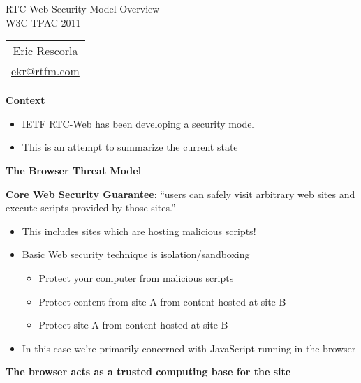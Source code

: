 \documentclass[helvetica]{seminar}
\newcommand{\heading}[1]{%
  \begin{center} 
    \large\bf 
    #1 
  \end{center} 
  \vspace{.4 in}}
\begin{document}
\begin{slide}
\begin{center}
\vspace{1 in}
\LARGE{{\bf}RTC-Web Security Model Overview}\\
\vspace{.2in}
\large{{W3C TPAC 2011}} \\
\vspace{3em}
\large{
\begin{tabular}{c}
Eric Rescorla \\
\url{ekr@rtfm.com}
\end{tabular}
}
\end{center}

\end{slide}


\centerslidesfalse 



\begin{slide}
\heading{Context}

\begin{itemize}
\item IETF RTC-Web has been developing a security model
\item This is an attempt to summarize the current state
\end{itemize}

\end{slide}


\begin{slide}
\heading{The Browser Threat Model}

\textbf{Core Web Security Guarantee}: ``users can safely visit arbitrary web sites
and execute scripts provided by those sites.''\cite{huang-cache}

\vspace{1em}

\begin{itemize}
\item This includes sites which are hosting malicious scripts!
\item Basic Web security technique is isolation/sandboxing
  \begin{itemize}
  \item Protect your computer from malicious scripts
  \item Protect content from site A from content hosted at site B
  \item Protect site A from content hosted at site B
  \end{itemize}
\item In this case we're primarily concerned with JavaScript running in the browser
\end{itemize}

\textbf{The browser acts as a trusted computing base for the site}

\end{slide}
\end{document}
